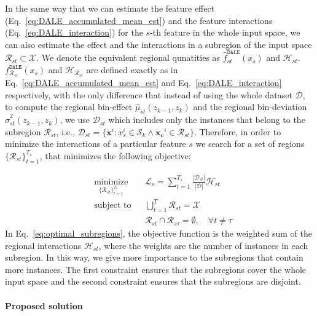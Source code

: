 \documentclass[runningheads]{llncs}
\newcommand{\xb}{\mathbf{x}}
\newcommand{\xc}{\mathbf{x_c}}
\begin{document}
In the same way that we can estimate the feature effect (Eq.~\eqref{eq:DALE_accumulated_mean_est}) and
the feature interactions (Eq.~\eqref{eq:DALE_interaction}) for the $s$-th feature in the whole input space,
we can also estimate the effect and the interactions in a subregion of the input space \(\mathcal{R}_{st} \subset \mathcal{X}\).
We denote the equivalent regional qunatities as $\hat{f}^{\mathtt{DALE}}_{st}(x_s)$ and $\mathcal{H}_{st}$.
$f^{\mathtt{DALE}}_{\mathcal{R}_{st}}(x_s)$ and $\mathcal{H}_{\mathcal{R}_{st}}$ are defined exactly as in
Eq.~\eqref{eq:DALE_accumulated_mean_est} and Eq.~\eqref{eq:DALE_interaction} respectively,
with the only difference that instead of using the whole dataset \(\mathcal{D}\), to compute the regional bin-effect $\hat{\mu}_{st}(z_{k-1}, z_k)$
and the regional bin-deviation $\hat{\sigma}_{st}^2(z_{k-1}, z_k)$,
we use $\mathcal{D}_{st}$ which includes only the instances that belong to the subregion \(\mathcal{R}_{st}\),
i.e., $\mathcal{D}_{st} = \{\xb^i: x_s^i \in \mathcal{S}_k \land \xc^i \in \mathcal{R}_{st}\}$.
Therefore, in order to minimize the interactions of a particular feature $s$ we search for a set of regions \(\{\mathcal{R}_{st}\}_{t=1}^{T_s}\),
that minimizes the following objective:

\begin{equation}
  \label{eq:optimal_subregions}
  \begin{aligned}
    & \underset{\{\mathcal{R}_{st}\}_{t=1}^{T_s}}{\text{minimize}}
    & & \mathcal{L}_s = \sum_{t=1}^{T_s} \frac{| \mathcal{D}_{st} |}{|\mathcal{D}|} \mathcal{H}_{st} \\
    & \text{subject to}
    & & \bigcup_{t=1}^{T} \mathcal{R}_{st} = \mathcal{X} \\
    & & & \mathcal{R}_{st} \cap \mathcal{R}_{s\tau} = \emptyset, \quad \forall t \neq \tau
  \end{aligned}
\end{equation}
%
In Eq.~\eqref{eq:optimal_subregions}, the objective function is the weighted sum of the regional interactions $\mathcal{H}_{st}$,
where the weights are the number of instances in each subregion.
In this way, we give more importance to the subregions that contain more instances.
The first constraint ensures that the subregions cover the whole input space and the second constraint ensures that the subregions are disjoint.

\paragraph{Proposed solution}
\end{document}
